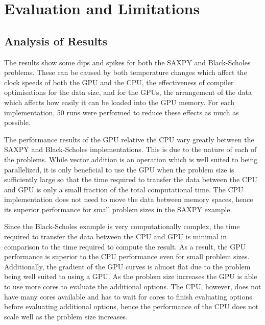 \documentclass{sig-alternate-05-2015}
\begin{document}
\section{Evaluation and Limitations}\label{sec:evaluation}

\subsection{Analysis of Results}

The results show some dips and spikes for both the SAXPY and Black-Scholes
problems. These can be caused by both temperature changes which affect the clock speeds of both the GPU and
the CPU, the effectiveness of compiler optimisations for the data size, and for the GPUs, the arrangement of
the data which affects how easily it can be loaded into the GPU memory. For each implementation, 50 runs
were performed to reduce these effects as much as possible.

The performance results of the GPU relative the CPU vary greatly between the SAXPY and Black-Scholes
implementations. This is due to the nature of each of the problems. While vector addition is an operation
which is well
suited to being parallelized, it is only beneficial to use the GPU when the problem size is sufficiently large
so 
that the time required to transfer the data between the CPU and GPU is only a small fraction of the total
computational time. The CPU implementation does not need to move the data between memory spaces, hence its superior performance for
small problem sizes in the SAXPY example.

Since the Black-Scholes example is very computationally complex, the time required to transfer the data
between the CPU and GPU is minimal in comparison to the time required to compute the result. As a result, the GPU
performance is superior to the CPU performance even for small problem sizes. Additionally, the gradient of the
GPU curves is almost flat due to the problem being well suited to using a GPU. As the problem size increases
the GPU is able to use more cores to evaluate the additional options. The CPU, however, does not have many
cores available and has to wait for cores to finish evaluating options before evaluating additional options, hence the performance of the CPU does not scale well as the problem size
increases.
\end{document}
